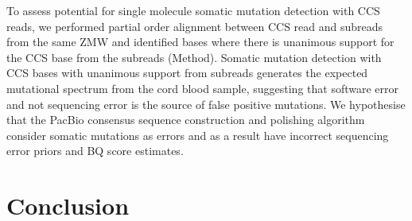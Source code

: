 To assess potential for single molecule somatic mutation detection with CCS reads, we performed partial order alignment between CCS read and subreads from the same ZMW and identified bases where there is unanimous support for the CCS base from the subreads (Method). Somatic mutation detection with CCS bases with unanimous support from subreads generates the expected mutational spectrum from the cord blood sample, suggesting that software error and not sequencing error is the source of false positive mutations. We hypothesise that the PacBio consensus sequence construction and polishing algorithm consider somatic mutations as errors and as a result have incorrect sequencing error priors and BQ score estimates. 

\section{Conclusion}
%
%
%
%
